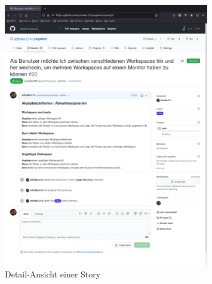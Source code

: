 \documentclass{article}
\begin{document}
\begin{figure}[H]
	\includegraphics[width=0.8\textwidth]{issue-detail}
	\centering
	\caption{Detail-Ansicht einer Story}
\end{figure}
\end{document}
